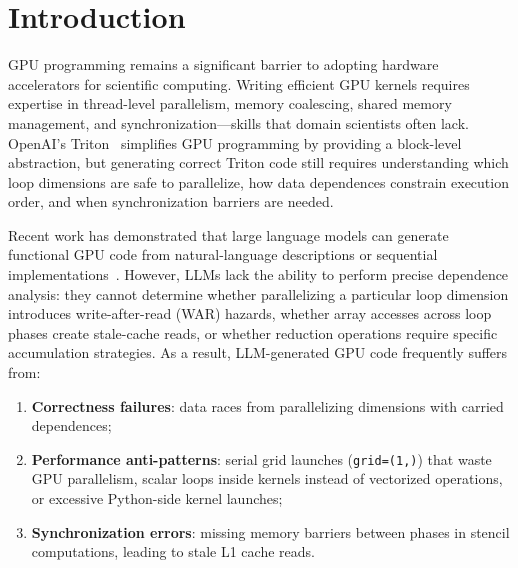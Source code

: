 \documentclass[sigconf]{acmart}
\begin{document}


\maketitle

\section{Introduction}
\label{sec:intro}

GPU programming remains a significant barrier to adopting hardware
accelerators for scientific computing.  Writing efficient GPU kernels
requires expertise in thread-level parallelism, memory coalescing,
shared memory management, and synchronization---skills that domain
scientists often lack.  OpenAI's Triton~\cite{tillet2019triton}
simplifies GPU programming by providing a block-level abstraction, but
generating correct Triton code still requires understanding which loop
dimensions are safe to parallelize, how data dependences constrain
execution order, and when synchronization barriers are needed.

Recent work has demonstrated that large language models can generate
functional GPU code from natural-language descriptions or sequential
implementations~\cite{chen2024chatgpt,nichols2024modeling,
ouyang2024kernelbench}.  However, LLMs lack the ability to perform
precise dependence analysis: they cannot determine whether parallelizing
a particular loop dimension introduces write-after-read (WAR) hazards,
whether array accesses across loop phases create stale-cache reads, or
whether reduction operations require specific accumulation strategies.
As a result, LLM-generated GPU code frequently suffers from:
\begin{enumerate}
  \item \textbf{Correctness failures}: data races from parallelizing
    dimensions with carried dependences;
  \item \textbf{Performance anti-patterns}: serial grid launches
    (\texttt{grid=(1,)}) that waste GPU parallelism, scalar loops inside
    kernels instead of vectorized operations, or excessive Python-side
    kernel launches;
  \item \textbf{Synchronization errors}: missing memory barriers between
    phases in stencil computations, leading to stale L1 cache reads.
\end{enumerate}
\end{document}

